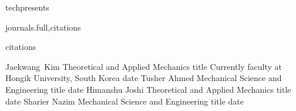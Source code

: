 \documentclass[numbers]{cv}
\begin{document}
\begin{techpresents}{techpresents}
  \nocite{admal:tadmor:2010:USNCTAM}
  \nocite{admal:tadmor:2011:FREUND}
  \nocite{admal:tadmor:2011:USNCCM}
  \nocite{admal:tadmor:2013:SES}
  \nocite{admal:tadmor:2013:CALTECH}
  \nocite{admal:tadmor:2013:IPAM}
  \nocite{admal:2013:SNP}
  \nocite{admal:tadmor:2014:TMS}
  \nocite{admal:tadmor:2015:USNCCM}
  \nocite{admal:marian:2016:MMM}
  \nocite{admal:po::2017:CECAM}
  \nocite{admal:2020:SES}
  \nocite{admal:2021a:USNCCM}
  \nocite{admal:2021b:USNCCM}
  \nocite{admal:2021c:USNCCM}
  \nocite{admal:2022:TMS}
  \nocite{admal:2022:USNCTAM}
  \nocite{admal:2022:MMM}
  \nocite{admal:2023:USNCCM}
  \nocite{admal:2023:SESa}
  \nocite{admal:2023:SESb}
  \nocite{admal:2023:SESc}
  \nocite{admal:2025:TMSb}
\end{techpresents}

\begin{chapters}{journals.full,citations}
  \nocite{admal:tadmor:book:2010}
\end{chapters}

\begin{patents}{citations}
  \nocite{admal:aradhya:1}
\end{patents}

\begin{students}
    \studentitem
            {Jaekwang~Kim}
            {Theoretical and Applied Mechanics}
            {title}
            {Currently faculty at Hongik University, South Korea}
            {date}
    \studentitem
            {Tusher Ahmed}
            {Mechanical Science and Engineering}
            {title}
            {}
            {date}
    \studentitem
            {Himanshu Joshi}
            {Theoretical and Applied Mechanics}
            {title}
            {}
            {date}
    \studentitem
            {Sharier Nazim}
            {Mechanical Science and Engineering}
            {title}
            {}
            {date}
\end{students}
\end{document}
